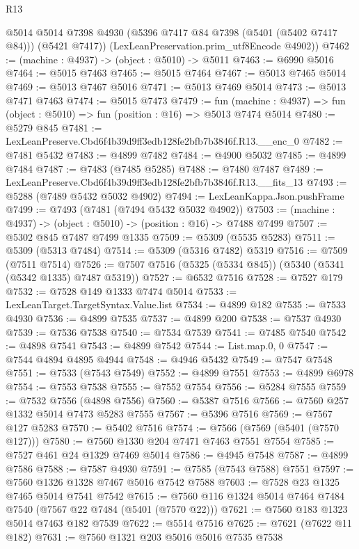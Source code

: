 \begin{lexlean}{R13}
\begin{coremodule}
        @5014
        @5014
        @7398
        @4930
        (@5396 @7417 @84 @7398 (@5401 (@5402 @7417 @84)))
        (@5421 @7417))
      (LexLeanPreservation.prim_utf8Encode @4902))
@7462 := (machine : @4937) -> (object : @5010) -> @5011
@7463 := @6990 @5016
@7464 := @5015 @7463
@7465 := @5015 @7464
@7467 := @5013 @7465 @5014
@7469 := @5013 @7467 @5016
@7471 := @5013 @7469 @5014
@7473 := @5013 @7471 @7463
@7474 := @5015 @7473
@7479 := fun (machine : @4937) => fun (object : @5010) => fun (position : @16) => @5013 @7474 @5014
@7480 := @5279 @845
@7481 := LexLeanPreserve.Cbd6f4b39d9ff3edb128fe2bfb7b3846f.R13.__enc_0
@7482 := @7481 @5432
@7483 := @4899 @7482
@7484 := @4900 @5032
@7485 := @4899 @7484
@7487 := @7483 (@7485 @5285)
@7488 := @7480 @7487
@7489 := LexLeanPreserve.Cbd6f4b39d9ff3edb128fe2bfb7b3846f.R13.__fits_13
@7493 := @5288 (@7489 @5432 @5032 @4902)
@7494 := LexLeanKappa.Json.pushFrame
@7499 := @7493 (@7481 (@7494 @5432 @5032 @4902))
@7503 := (machine : @4937) -> (object : @5010) -> (position : @16) -> @7488 @7499
@7507 := @5302 @845 @7487 @7499 @1335
@7509 := @5309 (@5535 @5283)
@7511 := @5309 (@5313 @7484)
@7514 := @5309 (@5316 @7482) @5319
@7516 := @7509 (@7511 @7514)
@7526 := @7507 @7516 (@5325 (@5334 @845)) (@5340 (@5341 (@5342 @1335) @7487 @5319))
@7527 := @6532 @7516
@7528 := @7527 @179
@7532 := @7528 @149 @1333 @7474 @5014
@7533 := LexLeanTarget.TargetSyntax.Value.list
@7534 := @4899 @182
@7535 := @7533 @4930
@7536 := @4899 @7535
@7537 := @4899 @200
@7538 := @7537 @4930
@7539 := @7536 @7538
@7540 := @7534 @7539
@7541 := @7485 @7540
@7542 := @4898 @7541
@7543 := @4899 @7542
@7544 := List.map.{0, 0}
@7547 := @7544 @4894 @4895 @4944
@7548 := @4946 @5432
@7549 := @7547 @7548
@7551 := @7533 (@7543 @7549)
@7552 := @4899 @7551
@7553 := @4899 @6978
@7554 := @7553 @7538
@7555 := @7552 @7554
@7556 := @5284 @7555
@7559 := @7532 @7556 (@4898 @7556)
@7560 := @5387 @7516
@7566 := @7560 @257 @1332 @5014 @7473 @5283 @7555
@7567 := @5396 @7516
@7569 := @7567 @127 @5283
@7570 := @5402 @7516
@7574 := @7566 (@7569 (@5401 (@7570 @127)))
@7580 := @7560 @1330 @204 @7471 @7463 @7551 @7554
@7585 := @7527 @461 @24 @1329 @7469 @5014
@7586 := @4945 @7548
@7587 := @4899 @7586
@7588 := @7587 @4930
@7591 := @7585 (@7543 @7588) @7551
@7597 := @7560 @1326 @1328 @7467 @5016 @7542 @7588
@7603 := @7528 @23 @1325 @7465 @5014 @7541 @7542
@7615 := @7560 @116 @1324 @5014 @7464 @7484 @7540 (@7567 @22 @7484 (@5401 (@7570 @22)))
@7621 := @7560 @183 @1323 @5014 @7463 @182 @7539
@7622 := @5514 @7516
@7625 := @7621 (@7622 @11 @182)
@7631 := @7560 @1321 @203 @5016 @5016 @7535 @7538

\end{coremodule}
\end{lexlean}
